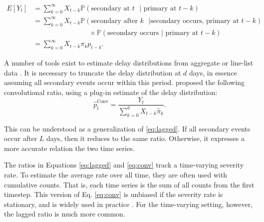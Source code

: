 \documentclass{article}
\begin{document}
\begin{align}\label{eq:model}
    E[Y_t] &= \sum_{k=0}^\infty X_{t-k} \mathbb{P}(\text{secondary at $t$ }\vert\text{ primary at }t-k) \nonumber \\
            &= \sum_{k=0}^\infty X_{t-k} \mathbb{P}(\text{secondary after $k$ }\vert\text{secondary occurs, primary at }t-k) \nonumber \\
    &\qquad\qquad\qquad\qquad\times\mathbb{P}(\text{secondary occurs }\vert\text{ primary at $t-k$}) \nonumber \\
    &= \sum_{k=0}^\infty X_{t-k} \pi_k p_{t-k}.%
\end{align}

A number of tools exist to estimate delay distributions from aggregate or line-list data \cite{delay_distrs}. It is necessary to truncate the delay distribution at $d$ days, in essence assuming all secondary events occur within this period. \citeauthor{UKpaper} proposed the following convolutional ratio, using a plug-in estimate of the delay distribution:
\begin{equation}\label{eq:conv}
    \hat{p}_t^{\text{Conv}} = \frac{Y_t}{\sum_{k=0}^d X_{t-k}\hat\pi_k}.%
\end{equation}

\noindent This can be understood as a generalization of \ref{eq:lagged}. If all secondary events occur after $L$ days, then it reduces to the same ratio. Otherwise, it expresses a more accurate relation the two time series. 

The ratios in Equations \ref{eq:lagged} and \ref{eq:conv} track a time-varying severity rate. To estimate the average rate over all time, they are often used with cumulative counts. That is, each time series is the sum of all counts from the first timestep. This version of Eq. \ref{eq:conv} is unbiased if the severity rate is stationary, and is widely used in practice \cite{nishiura}. For the time-varying setting, however, the lagged ratio is much more common.
\end{document}
